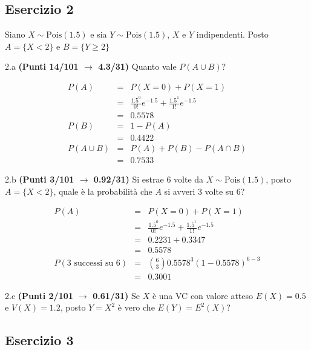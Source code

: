 \documentclass[
  11pt,
]{book}
\theoremstyle{mytheoremstyle}
\theoremstyle{mydefstyle}
\newenvironment{sol}
  {
  \begin{tcolorbox}[enhanced,breakable,arc=0.1mm,boxrule=1pt,colback=white,colframe=iblue,
  title=\bf \fontfamily{lmss}\selectfont \hspace{.5 cm} Soluzione,drop fuzzy shadow]

}{
\end{tcolorbox}
  }
\begin{document}
\subsection{Esercizio 2}\label{esercizio-2-12}

Siano \(X\sim \text{Pois}(1.5)\) e sia \(Y\sim \text{Pois}(1.5)\), \(X\) e \(Y\) indipendenti. Posto \(A=\{X<2\}\) e \(B=\{Y\ge 2\}\)

2.a \textbf{(Punti 14/101 \(\rightarrow\) 4.3/31)} Quanto vale \(P(A\cup B)\)?

\begin{sol}
\begin{eqnarray*}
  P(A) &=&  P(X=0)+P(X=1)\\
  &=& \frac{1.5^0}{0!}e^{-1.5}+\frac{1.5^1}{1!}e^{-1.5}\\
  &=& 0.5578\\
  P(B) &=& 1-P(A)\\
  &=&0.4422\\
  P(A\cup B) &=& P(A)+P(B)-P(A\cap B)\\
  &=& 0.7533
\end{eqnarray*}

\end{sol}

2.b \textbf{(Punti 3/101 \(\rightarrow\) 0.92/31)} Si estrae 6 volte da \(X\sim \text{Pois}(1.5)\), posto \(A=\{X<2\}\), quale è la probabilità che \(A\) si avveri 3 volte su 6?

\begin{sol}
\begin{eqnarray*}
  P(A) &=&  P(X=0)+P(X=1)\\
  &=& \frac{1.5^0}{0!}e^{-1.5}+\frac{1.5^1}{1!}e^{-1.5}\\
  &=& 0.2231+0.3347\\
  &=& 0.5578\\
  P(\text{3 successi su 6}) &=& \binom{6}{3}0.5578^3(1-0.5578)^{6-3}\\
  &=&0.3001
\end{eqnarray*}

\end{sol}

2.c \textbf{(Punti 2/101 \(\rightarrow\) 0.61/31)} Se \(X\) è una VC con valore atteso \(E(X)=0.5\) e \(V(X)=1.2\), posto \(Y=X^2\) è vero che \(E(Y)=E^2(X)\)?

\subsection{Esercizio 3}\label{esercizio-3-11}
\end{document}
